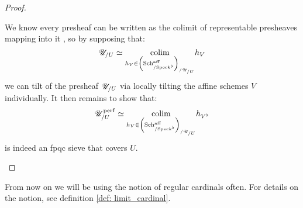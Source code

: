 \begin{proof}
\begin{enumerate}
$$                                    $$
                                We know every presheaf can be written as the colimit of representable presheaves mapping into it \cite[Section 4]{nlab:presheaf}, so by supposing that:
                                    $$\mathscr{U}_{/U} \simeq \underset{ h_V \in \left( \mathrm{Sch}^{\mathrm{aff}}_{/\mathrm{Spec} k^{\flat}} \right)_{/\mathscr{U}_{/U}} }{\operatorname{colim}} h_V$$
                                we can tilt of the presheaf $\mathscr{U}_{/U}$ via locally tilting the affine schemes $V$ individually. It then remains to show that:
                                    $$\mathscr{U}_{/U}^{\mathrm{perf}} \simeq \underset{ h_V \in \left( \mathrm{Sch}^{\mathrm{aff}}_{/\mathrm{Spec} k^{\flat}} \right)_{/\mathscr{U}_{/U}} }{\operatorname{colim}} h_{V^{\flat}}$$
                                is indeed an fpqc sieve that covers $U$. 
                            \end{enumerate}
                        \end{proof}
                        
                    \begin{remark}
                        From now on we will be using the notion of regular cardinals often. For details on the notion, see definition \ref{def: limit_cardinal}.
                    \end{remark}
                    
